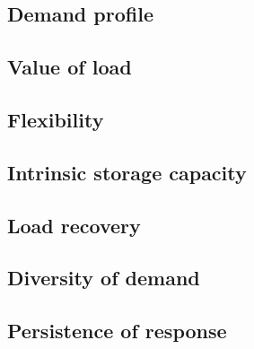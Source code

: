 \subsection{Demand profile}

\subsection{Value of load}

\subsection{Flexibility}

\subsection{Intrinsic storage capacity}

\subsection{Load recovery}

\subsection{Diversity of demand}

\subsection{Persistence of response}



